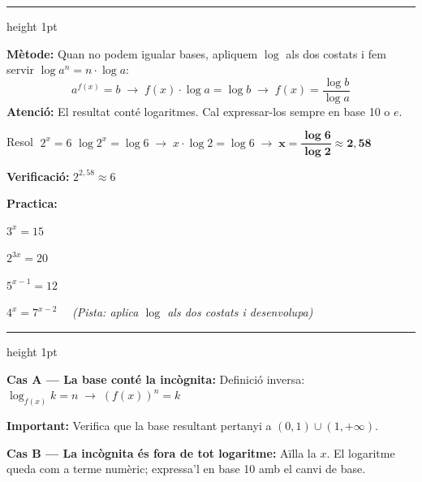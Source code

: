 \documentclass[12pt,a4paper]{article}
\begin{document}
\newpage

\vspace{0.12cm}\hrule height 1pt\vspace{0.3cm}


\begin{metodebox}
\textbf{Mètode:} Quan no podem igualar bases, apliquem $\log$ als dos costats i fem servir $\log a^n = n\cdot\log a$:
\[
a^{f(x)} = b \;\longrightarrow\; f(x)\cdot\log a = \log b \;\longrightarrow\; f(x) = \frac{\log b}{\log a}
\]
\textbf{Atenció:} El resultat conté logaritmes. Cal expressar-los sempre en base 10 o $e$.
\end{metodebox}

\vspace{0.2cm}

\begin{tcolorbox}[exemplebox]
Resol $\;2^x = 6$
\tcblower
$\log 2^x = \log 6 \;\longrightarrow\; x\cdot\log 2 = \log 6 \;\longrightarrow\; \boldsymbol{x = \dfrac{\log 6}{\log 2} \approx 2{,}58}$

\textbf{Verificació:} $2^{2{,}58}\approx 6$ \checkmark
\end{tcolorbox}

\vspace{0.3cm}
\noindent\textbf{Practica:}

\begin{exercicis}
    \item $3^x = 15$
    \item $2^{3x} = 20$
    \item $5^{x-1} = 12$
    \item $4^x = 7^{x-2} \quad$ \textit{(Pista: aplica $\log$ als dos costats i desenvolupa)}
\end{exercicis}

\newpage
\vspace{0.12cm}\hrule height 1pt\vspace{0.3cm}

\begin{metodebox}
\textbf{Cas A --- La base conté la incògnita:} Definició inversa: $\log_{f(x)} k = n \;\longrightarrow\; (f(x))^n = k$

\textbf{Important:} Verifica que la base resultant pertanyi a $(0,1)\cup(1,+\infty)$.

\medskip
\textbf{Cas B --- La incògnita és fora de tot logaritme:} Aïlla la $x$. El logaritme queda com a terme numèric; expressa'l en base 10 amb el canvi de base.
\end{metodebox}
\end{document}

